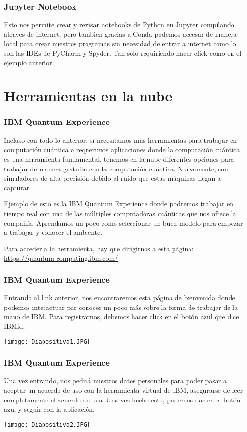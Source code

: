 \documentclass[spanish]{beamer}
\begin{document}
 \newpage\setlength{\parskip}{1mm}
 \begin{frame}[fragile]
 \frametitle{Jupyter Notebook} 
 \justify 
 Esto nos permite crear y revisar notebooks de Python en Jupyter compilando atraves de internet, pero tambien gracias a Conda podemos accesar de manera local para crear nuestros programas sin necesidad de entrar a internet como lo son las IDEs de PyCharm y Spyder. Tan solo requiriendo hacer click como en el ejemplo anterior.
\end{frame}

\section{Herramientas en la nube}        
 \setlength{\parskip}{1mm}
 \begin{frame}[fragile]
 \frametitle{IBM Quantum Experience} 
 \justify    
 Incluso con todo lo anterior, si necesitamos más herramientas para trabajar en computación cuántica o requerimos aplicaciones donde la computación cuántica es una herramienta fundamental, tenemos en la nube diferentes opciones para trabajar de manera gratuita con la computación cuántica. Nuevamente, son simuladores de alta precisión debido al ruido que estas máquinas llegan a capturar.
 
 Ejemplo de esto es la IBM Quantum Experience donde podremos trabajar en tiempo real con una de las múltiples computadoras cuánticas que nos ofrece la compañía. Aprendamos un poco como seleccionar un buen modelo para empezar a trabajar y conocer el ambiente.
 
 Para acceder a la herramienta, hay que dirigirnos a esta página:  \url{https://quantum-computing.ibm.com/}

 \end{frame}
 
 \newpage\begin{frame}
 \frametitle{IBM Quantum Experience} 
 \justify 
Entrando al link anterior, nos encontraremos esta página de bienvenida donde podemos interactuar par conocer un poco más sobre la forma de trabajar de la mano de IBM. Para registrarnos, debemos hacer click en el botón azul que dice IBMid.
 
 \centering\texttt{[image: Diapositiva1.JPG]}
 \end{frame}
 
 \newpage\begin{frame}
 \frametitle{IBM Quantum Experience} 
 \justify 
 Una vez entrando, nos pedirá nuestros datos personales para poder pasar a aceptar un acuerdo de uso con la herramienta virtual de IBM, asegurarse de leer completamente el acuerdo de uso. Una vez hecho esto, podemos dar en el botón azul y seguir con la aplicación.
 
 \centering\texttt{[image: Diapositiva2.JPG]}
 \end{frame}
 
\end{document}
